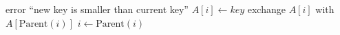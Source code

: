 \begin{algorithmic}
\State error ``new key is smaller than current key''
\EndIf
\State $A[i] \gets key$
\State exchange $A[i]$ with $A[\mathrm{Parent}(i)]$
\State $i \gets \mathrm{Parent}(i)$
\EndWhile
\EndFunction
\end{algorithmic}